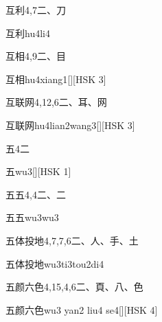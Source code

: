 \begin{entry}{互利}{4,7}{⼆、⼑}
  \begin{phonetics}{互利}{hu4li4}
  \end{phonetics}
\end{entry}

\begin{entry}{互相}{4,9}{⼆、⽬}
  \begin{phonetics}{互相}{hu4xiang1}[][HSK 3]
  \end{phonetics}
\end{entry}

\begin{entry}{互联网}{4,12,6}{⼆、⽿、⽹}
  \begin{phonetics}{互联网}{hu4lian2wang3}[][HSK 3]
  \end{phonetics}
\end{entry}

\begin{entry}{五}{4}{⼆}
  \begin{phonetics}{五}{wu3}[][HSK 1]
  \end{phonetics}
\end{entry}

\begin{entry}{五五}{4,4}{⼆、⼆}
  \begin{phonetics}{五五}{wu3wu3}
  \end{phonetics}
\end{entry}

\begin{entry}{五体投地}{4,7,7,6}{⼆、⼈、⼿、⼟}
  \begin{phonetics}{五体投地}{wu3ti3tou2di4}
  \end{phonetics}
\end{entry}

\begin{entry}{五颜六色}{4,15,4,6}{⼆、⾴、⼋、⾊}
  \begin{phonetics}{五颜六色}{wu3 yan2 liu4 se4}[][HSK 4]
  \end{phonetics}
\end{entry}


